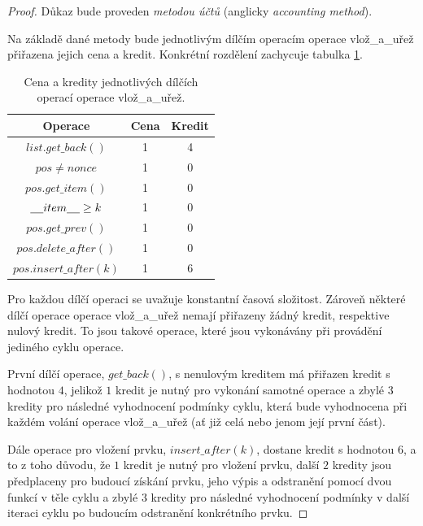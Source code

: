 \documentclass[a4paper, 12pt]{article}
\theoremstyle{definition}
\theoremstyle{definition}
\theoremstyle{definition}
\theoremstyle{remark}
\theoremstyle{remark}
\theoremstyle{remark}
\theoremstyle{remark}
\begin{document}
\begin{proof}
    Důkaz bude proveden \textit{metodou účtů} (anglicky \textit{accounting method}).
    
    Na základě dané metody bude jednotlivým dílčím operacím operace {\selectfont vlož\_a\_uřež} přiřazena jejich cena a kredit. Konkrétní rozdělení zachycuje tabulka \ref{table}.

    \begin{table}[!ht]
    \begin{center}
    \begin{tabular}{||c c c||} 
     \hline
     Operace & Cena & Kredit \\ [0.5ex] 
     \hline\hline
     $list.get\_back()$ & 1 & 4 \\ 
     \hline
     $pos \neq nonce$ & 1 & 0 \\
     \hline
     $pos.get\_item()$ & 1 & 0 \\
     \hline
     $\underline{\hspace{4mm}} item\underline{\hspace{4mm}} \geq k$ & 1 & 0 \\
     \hline
     $pos.get\_prev()$ & 1 & 0 \\
     \hline
     $pos.delete\_after()$ & 1 & 0 \\
     \hline
     $pos.insert\_after(k)$ & 1 & 6 \\ [1ex] 
     \hline
    \end{tabular}
    \caption{\label{table}Cena a kredity jednotlivých dílčích operací operace {\selectfont vlož\_a\_uřež}.}
    \end{center}
    \end{table}

    Pro každou dílčí operaci se uvažuje konstantní časová složitost. Zároveň některé dílčí operace operace {\selectfont vlož\_a\_uřež} nemají přiřazeny žádný kredit, respektive nulový kredit. To jsou takové operace, které jsou vykonávány při provádění jediného cyklu operace.
    
    První dílčí operace, $get\_back()$, s nenulovým kreditem má přiřazen kredit s hodnotou $4$, jelikož $1$ kredit je nutný pro vykonání samotné operace a zbylé $3$ kredity pro následné vyhodnocení podmínky cyklu, která bude vyhodnocena při každém volání operace {\selectfont vlož\_a\_uřež} (ať již celá nebo jenom její první část). 
    
    Dále operace pro vložení prvku, $insert\_after(k)$, dostane kredit s hodnotou $6$, a to z toho důvodu, že $1$ kredit je nutný pro vložení prvku, další $2$ kredity jsou předplaceny pro budoucí získání prvku, jeho výpis a odstranění pomocí dvou funkcí v těle cyklu a zbylé $3$ kredity pro následné vyhodnocení podmínky v další iteraci cyklu po budoucím odstranění konkrétního prvku.


\end{proof}
\end{document}
